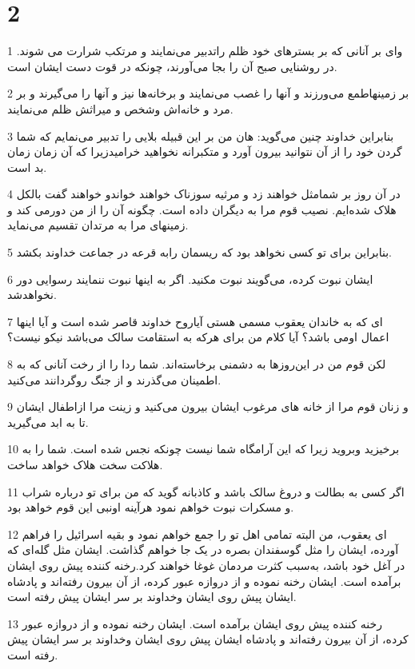 \chapter{2}

\par 1 وای بر آنانی که بر بسترهای خود ظلم راتدبیر می‌نمایند و مرتکب شرارت می شوند. در روشنایی صبح آن را بجا می‌آورند، چونکه در قوت دست ایشان است.
\par 2 بر زمینهاطمع می‌ورزند و آنها را غصب می‌نمایند و برخانه‌ها نیز و آنها را می‌گیرند و بر مرد و خانه‌اش وشخص و میراثش ظلم می‌نمایند.
\par 3 بنابراین خداوند چنین می‌گوید: هان من بر این قبیله بلایی را تدبیر می‌نمایم که شما گردن خود را از آن نتوانید بیرون آورد و متکبرانه نخواهید خرامیدزیرا که آن زمان زمان بد است.
\par 4 در آن روز بر شمامثل خواهند زد و مرثیه سوزناک خواهند خواندو خواهند گفت بالکل هلاک شده‌ایم. نصیب قوم مرا به دیگران داده است. چگونه آن را از من دورمی کند و زمینهای مرا به مرتدان تقسیم می‌نماید.
\par 5 بنابراین برای تو کسی نخواهد بود که ریسمان رابه قرعه در جماعت خداوند بکشد.
\par 6 ایشان نبوت کرده، می‌گویند نبوت مکنید. اگر به اینها نبوت ننمایند رسوایی دور نخواهدشد.
\par 7 ‌ای که به خاندان یعقوب مسمی هستی آیاروح خداوند قاصر شده است و آیا اینها اعمال اومی باشد؟ آیا کلام من برای هر‌که به استقامت سالک می‌باشد نیکو نیست؟
\par 8 لکن قوم من در این‌روزها به دشمنی برخاسته‌اند. شما ردا را از رخت آنانی که به اطمینان می‌گذرند و از جنگ روگردانند می‌کنید.
\par 9 و زنان قوم مرا از خانه های مرغوب ایشان بیرون می‌کنید و زینت مرا ازاطفال ایشان تا به ابد می‌گیرید.
\par 10 برخیزید وبروید زیرا که این آرامگاه شما نیست چونکه نجس شده است. شما را به هلاکت سخت هلاک خواهد ساخت.
\par 11 اگر کسی به بطالت و دروغ سالک باشد و کاذبانه گوید که من برای تو درباره شراب و مسکرات نبوت خواهم نمود هرآینه اونبی این قوم خواهد بود.
\par 12 ‌ای یعقوب، من البته تمامی اهل تو را جمع خواهم نمود و بقیه اسرائیل را فراهم آورده، ایشان را مثل گوسفندان بصره در یک جا خواهم گذاشت. ایشان مثل گله‌ای که در آغل خود باشد، به‌سبب کثرت مردمان غوغا خواهند کرد.رخنه کننده پیش روی ایشان برآمده است. ایشان رخنه نموده و از دروازه عبور کرده، از آن بیرون رفته‌اند و پادشاه ایشان پیش روی ایشان وخداوند بر سر ایشان پیش رفته است.
\par 13 رخنه کننده پیش روی ایشان برآمده است. ایشان رخنه نموده و از دروازه عبور کرده، از آن بیرون رفته‌اند و پادشاه ایشان پیش روی ایشان وخداوند بر سر ایشان پیش رفته است.

